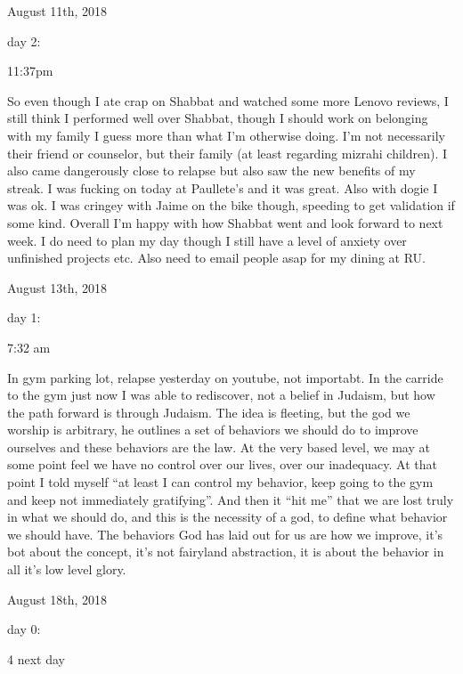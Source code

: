 \bigskip
\bigskip
August 11th, 2018

day 2:

11:37pm

So even though I ate crap on Shabbat and watched some more Lenovo
reviews, I still think I performed well over Shabbat, though I should
work on belonging with my family I guess more than what I'm otherwise
doing. I'm not necessarily their friend or counselor, but their family
(at least regarding mizrahi children). I also came dangerously close to
relapse but also saw the new benefits of my streak. I was fucking on
today at Paullete's and it was great. Also with dogie I was ok. I was
cringey with Jaime on the bike though, speeding to get validation if
some kind. Overall I'm happy with how Shabbat went and look forward to
next week. I do need to plan my day though I still have a level of
anxiety over unfinished projects etc. Also need to email people asap for
my dining at RU.

\bigskip
\bigskip
August 13th, 2018

day 1:

7:32 am

In gym parking lot, relapse yesterday on youtube, not importabt. In the
carride to the gym just now I was able to rediscover, not a belief in
Judaism, but how the path forward is through Judaism. The idea is
fleeting, but the god we worship is arbitrary, he outlines a set of
behaviors we should do to improve ourselves and these behaviors are the
law. At the very based level, we may at some point feel we have no
control over our lives, over our inadequacy. At that point I told myself
``at least I can control my behavior, keep going to the gym and keep not
immediately gratifying''. And then it ``hit me'' that we are lost truly
in what we should do, and this is the necessity of a god, to define what
behavior we should have. The behaviors God has laid out for us are how
we improve, it's bot about the concept, it's not fairyland abstraction,
it is about the behavior in all it's low level glory.

\bigskip
\bigskip
August 18th, 2018

day 0:

4 next day

